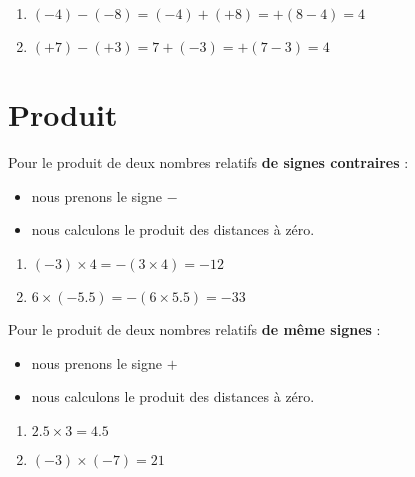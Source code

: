 \begin{propriete}
\begin{enumerate}
    \begin{example}
        \begin{enumerate}
            \item
                \( (-4)-(-8)=(-4)+(+8)=+(8-4)=4\)
            \item
                \( (+7)-(+3)=7+(-3)=+(7-3)=4\)
        \end{enumerate}
    \end{example}

    \end{enumerate}
\end{propriete}

\section{Produit}

\begin{propriete}
    Pour le produit de deux nombres relatifs {\bf de signes contraires} :
    \begin{itemize}
        \item nous prenons le signe \( -\)
        \item nous calculons le produit des distances à zéro.
    \end{itemize}

    \begin{example}
        \begin{enumerate}
            \item
                \( (-3)\times 4=-(3\times 4)=-12\)
            \item
                \( 6\times(-5.5)=-(6\times 5.5)=-33\)
        \end{enumerate}
    \end{example}

    Pour le produit de deux nombres relatifs {\bf de même signes} :
    \begin{itemize}
        \item nous prenons le signe \( +\)
        \item nous calculons le produit des distances à zéro.
    \end{itemize}
    
    \begin{example}
        \begin{enumerate}
            \item
                \( 2.5\times 3=4.5\)
            \item
                \( (-3)\times (-7)=21\)
        \end{enumerate}
    \end{example}

\end{propriete}

